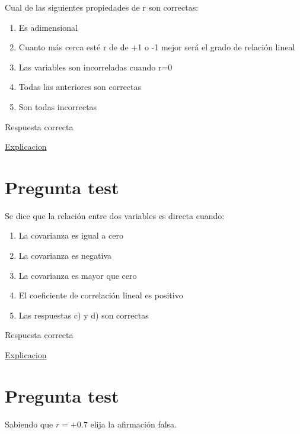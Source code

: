 \documentclass[
]{book}
\providecommand{\tightlist}{%
  \setlength{\itemsep}{0pt}\setlength{\parskip}{0pt}}
\begin{document}
Cual de las siguientes propiedades de r son correctas:

\begin{enumerate}
\def\labelenumi{\alph{enumi})}
\tightlist
\item
  Es adimensional
\item
  Cuanto más cerca esté r de de +1 o -1 mejor será el grado de relación lineal
\item
  Las variables son incorreladas cuando r=0
\item
  Todas las anteriores son correctas
\item
  Son todas incorrectas
\end{enumerate}

Respuesta correcta

\href{https://1fjmanzano.github.io/bioestadistica/relaci\%C3\%B3n-entre-variables-nume\%CC\%81ricas.html\#coeficiente-de-correlacio\%CC\%81n}{Explicacion}

\hypertarget{pregunta-test-140}{%
\section{Pregunta test}\label{pregunta-test-140}}

Se dice que la relación entre dos variables es directa cuando:

\begin{enumerate}
\def\labelenumi{\alph{enumi})}
\tightlist
\item
  La covarianza es igual a cero
\item
  La covarianza es negativa
\item
  La covarianza es mayor que cero
\item
  El coeficiente de correlación lineal es positivo
\item
  Las respuestas c) y d) son correctas
\end{enumerate}

Respuesta correcta

\href{https://1fjmanzano.github.io/bioestadistica/relaci\%C3\%B3n-entre-variables-nume\%CC\%81ricas.html\#coeficiente-de-correlacio\%CC\%81n}{Explicacion}

\hypertarget{pregunta-test-141}{%
\section{Pregunta test}\label{pregunta-test-141}}

Sabiendo que \(r=+0.7\) elija la afirmación falsa.
\end{document}
